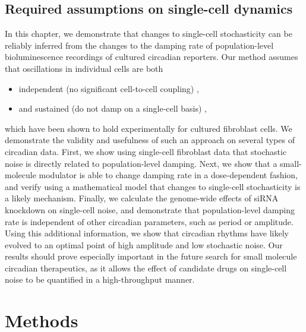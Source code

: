 \subsection{Required assumptions on single-cell dynamics}
In this chapter, we demonstrate that changes to single-cell stochasticity can be reliably inferred from the changes to the damping rate of population-level bioluminescence recordings of cultured circadian reporters.
Our method assumes that oscillations in individual cells are both
\begin{itemize}
  \item independent (no significant cell-to-cell coupling) \cite{Noguchi2013, Guenthner2014},
  \item and sustained (do not damp on a single-cell basis) \cite{Welsh2004, Nagoshi2004},
\end{itemize}
which have been shown to hold experimentally for cultured fibroblast cells.
We demonstrate the validity and usefulness of such an approach on several types of circadian data.
First, we show using single-cell fibroblast data that stochastic noise is directly related to population-level damping.
Next, we show that a small-molecule modulator is able to change damping rate in a dose-dependent fashion, and verify using a mathematical model that changes to single-cell stochasticity is a likely mechanism.
Finally, we calculate the genome-wide effects of siRNA knockdown on single-cell noise, and demonstrate that population-level damping rate is independent of other circadian parameters, such as period or amplitude.
Using this additional information, we show that circadian rhythms have likely evolved to an optimal point of high amplitude and low stochastic noise.
Our results should prove especially important in the future search for small molecule circadian therapeutics, as it allows the effect of candidate drugs on single-cell noise to be quantified in a high-throughput manner.

\section{Methods}

